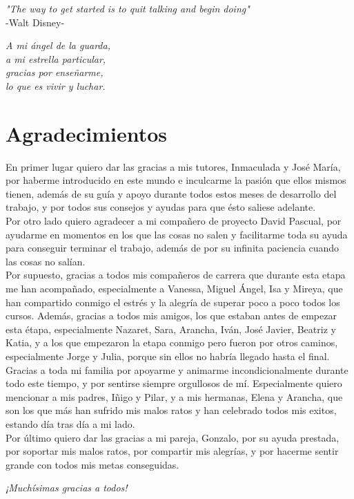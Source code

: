 {
	\vspace*{1cm}
	\begin{flushright}
		\textit{"The way to get started is to quit talking and begin doing"}\\
		\vspace{10pt}
		-Walt Disney-
	\end{flushright}
	
	\vspace*{14cm}
	\begin{flushright}
		\textit{A mi ángel de la guarda,\\
		a mi estrella particular,\\
		gracias por enseñarme,\\
		lo que es vivir y luchar.}
	\end{flushright}
}

\chapter*{Agradecimientos}

En primer lugar quiero dar las gracias a mis tutores, Inmaculada y José María, por haberme introducido en este mundo e inculcarme la pasión que ellos mismos tienen, además de su guía y apoyo durante todos estos meses de desarrollo del trabajo, y por todos sus consejos y ayudas para que ésto saliese adelante.\\
 
Por otro lado quiero agradecer a mi compañero de proyecto David Pascual, por ayudarme en momentos en los que las cosas no salen y facilitarme toda su ayuda para conseguir terminar el trabajo, además de por su infinita paciencia cuando las cosas no salían.\\

Por supuesto, gracias a todos mis compañeros de carrera que durante esta etapa me han acompañado, especialmente a Vanessa, Miguel Ángel, Isa y Mireya, que han compartido conmigo el estrés y la alegría de superar poco a poco todos los cursos. Además, gracias a todos mis amigos, los que estaban antes de empezar esta étapa,  especialmente Nazaret, Sara, Arancha, Iván, José Javier, Beatriz y Katia, y a los que empezaron la etapa conmigo pero fueron por otros caminos, especialmente Jorge y Julia, porque sin ellos no habría llegado hasta el final.\\

Gracias a toda mi familia por apoyarme y animarme incondicionalmente durante todo este tiempo, y por sentirse siempre orgullosos de mí. Especialmente quiero mencionar a mis padres, Iñigo y Pilar, y a mis hermanas, Elena y Arancha, que son los que más han sufrido mis malos ratos y han celebrado todos mis exitos, estando día tras día a mi lado.\\

Por último quiero dar las gracias a mi pareja, Gonzalo, por su ayuda prestada, por soportar mis malos ratos, por compartir mis alegrías, y por hacerme sentir grande con todos mis metas conseguidas.\\

\begin{flushright}
	\emph{¡Muchí­simas gracias a todos!}
\end{flushright}
